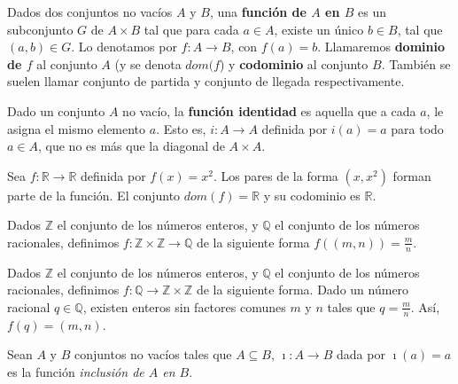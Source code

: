 \documentclass[12pt,]{krantz}
\theoremstyle{definition}
\theoremstyle{definition}
\theoremstyle{definition}
\theoremstyle{remark}
\let\BeginKnitrBlock\begin \let\EndKnitrBlock\end
\begin{document}
\BeginKnitrBlock{definition}
\protect\hypertarget{def:unnamed-chunk-31}{}{\label{def:unnamed-chunk-31}
}Dados dos conjuntos no vacíos \(A\) y \(B\), una \textbf{función de
\(A\) en \(B\)} es un subconjunto \(G\) de \(A\times B\) tal que para
cada \(a\in A\), existe un único \(b\in B\), tal que \((a,b)\in G\). Lo
denotamos por \(f: A\longrightarrow B\), con \(f(a)=b\). Llamaremos
\textbf{dominio de \(f\)} al conjunto \(A\) (y se denota \(dom(f\)) y
\textbf{codominio} al conjunto \(B\). También se suelen llamar conjunto
de partida y conjunto de llegada respectivamente.
\EndKnitrBlock{definition}

\BeginKnitrBlock{example}
\protect\hypertarget{exm:identidad}{}{\label{exm:identidad} }Dado un
conjunto \(A\) no vacío, la \textbf{función identidad} es aquella que a
cada \(a\), le asigna el mismo elemento \(a\). Esto es,
\(i: A\longrightarrow A\) definida por \(i(a)=a\) para todo \(a\in A\),
que no es más que la diagonal de \(A\times A\).
\EndKnitrBlock{example}

\BeginKnitrBlock{example}
\protect\hypertarget{exm:ejm1-12}{}{\label{exm:ejm1-12} }Sea
\(f: \mathbb{R}\longrightarrow\mathbb{R}\) definida por \(f(x)=x^{2}\).
Los pares de la forma \((x,x^{2})\) forman parte de la función. El
conjunto \(dom(f)=\mathbb{R}\) y su codominio es \(\mathbb{R}\).
\EndKnitrBlock{example}

\BeginKnitrBlock{example}
\protect\hypertarget{exm:ejm1-13}{}{\label{exm:ejm1-13} }Dados
\(\mathbb{Z}\) el conjunto de los números enteros, y \(\mathbb{Q}\) el
conjunto de los números racionales, definimos
\(f:\mathbb{Z}\times\mathbb{Z}\longrightarrow\mathbb{Q}\) de la
siguiente forma \(f((m,n))=\frac{m}{n}\).
\EndKnitrBlock{example}

\BeginKnitrBlock{example}
\protect\hypertarget{exm:ejm1-14}{}{\label{exm:ejm1-14} }Dados
\(\mathbb{Z}\) el conjunto de los números enteros, y \(\mathbb{Q}\) el
conjunto de los números racionales, definimos
\(f:\mathbb{Q}\longrightarrow \mathbb{Z}\times\mathbb{Z}\) de la
siguiente forma. Dado un número racional \(q\in\mathbb{Q}\), existen
enteros sin factores comunes \(m\) y \(n\) tales que \(q=\frac{m}{n}\).
Así, \(f(q)=(m,n)\).
\EndKnitrBlock{example}

\BeginKnitrBlock{example}
\protect\hypertarget{exm:ejm1-15}{}{\label{exm:ejm1-15} }Sean \(A\) y \(B\)
conjuntos no vacíos tales que \(A\subseteq B\),
\(\imath: A \longrightarrow B\) dada por \(\imath(a)=a\) es la función
\textit{inclusión de $A$ en $B$}.
\EndKnitrBlock{example}
\end{document}
